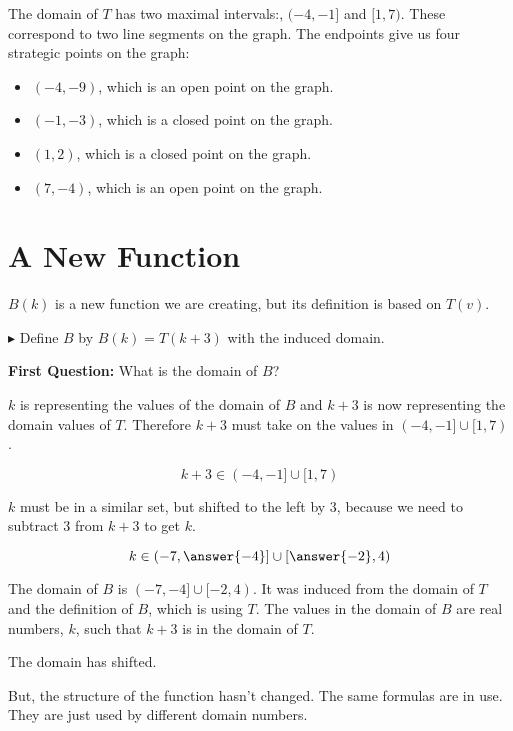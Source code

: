 \documentclass{ximera}
\begin{document}
The domain of $T$ has two maximal intervals:, $(-4,-1]$ and $[1,7)$.  These correspond to two line segments on the graph. The endpoints give us four strategic points on the graph: 

\begin{itemize}

\item $(-4, -9)$, which is an open point on the graph.
\item $(-1, -3)$, which is a closed point on the graph.
\item $(1, 2)$, which is a closed point on the graph.
\item $(7, -4)$, which is an open point on the graph.

\end{itemize}




\section{A New Function}

$B(k)$ is a new function we are creating, but its definition is based on $T(v)$.


$\blacktriangleright$ Define $B$ by $B(k) = T(k+3)$ with the induced domain.


\textbf{\textcolor{purple!85!blue}{First Question:}}   What is the domain of $B$?

$k$ is representing the values of the domain of $B$ and $k+3$ is now representing the domain values of $T$.  Therefore $k+3$ must take on the values in $(-4,-1] \cup [1,7)$.

\[     k+3 \in      (-4,-1] \cup [1,7)     \]


$k$ must be in a similar set, but shifted to the left by $3$, because we need to subtract $3$ from $k+3$ to get $k$.


\[     k \in      \left( -7,\answer{-4} \right] \cup \left[ \answer{-2},4 \right)     \]


The domain of $B$ is $(-7,-4] \cup [-2,4)$.   It was induced from the domain of $T$ and the definition of $B$, which is using $T$.  The values in the domain of $B$ are real numbers, $k$, such that $k+3$ is in the domain of $T$.

The domain has shifted. 


But, the structure of the function hasn't changed.  The same formulas are in use.  They are just used by different domain numbers.
\end{document}
